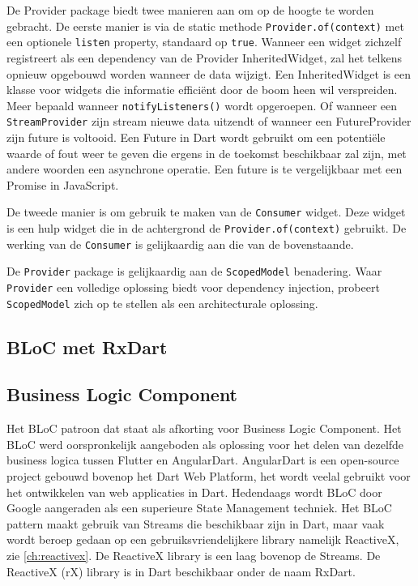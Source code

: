 De Provider package biedt twee manieren aan om op de hoogte te worden gebracht.
\newline
De eerste manier is via de static methode \verb|Provider.of(context)| met een optionele \verb|listen| property, standaard op \verb|true|.
Wanneer een widget zichzelf registreert als een dependency van de Provider InheritedWidget, zal het telkens opnieuw opgebouwd worden wanneer de data wijzigt. Een InheritedWidget is een klasse voor widgets die informatie efficiënt door de boom heen wil verspreiden.
 Meer bepaald wanneer \verb|notifyListeners()| wordt opgeroepen. Of wanneer een \verb|StreamProvider| zijn stream nieuwe data uitzendt of wanneer een FutureProvider zijn future is voltooid. Een Future in Dart wordt gebruikt om een potentiële waarde of fout weer te geven die ergens in de toekomst beschikbaar zal zijn, met andere woorden een asynchrone operatie. Een future is te vergelijkbaar met een Promise in JavaScript.

De tweede manier is om gebruik te maken van de \verb|Consumer| widget. Deze widget is een hulp widget die in de achtergrond de \verb|Provider.of(context)| gebruikt. De werking van de \verb|Consumer| is gelijkaardig aan die van de bovenstaande. 

De \verb|Provider| package is gelijkaardig aan de \verb|ScopedModel| benadering. Waar \verb|Provider| een volledige oplossing biedt voor dependency injection, probeert \verb|ScopedModel| zich op te stellen als een architecturale oplossing.

\subsection{BLoC met RxDart}
\subsection*{Business Logic Component}
Het BLoC patroon dat staat als afkorting voor Business Logic Component. Het BLoC werd oorspronkelijk aangeboden als oplossing voor het delen van dezelfde business logica tussen Flutter en AngularDart. AngularDart is een open-source project gebouwd bovenop het Dart Web Platform, het wordt veelal gebruikt voor het ontwikkelen van web applicaties in Dart. Hedendaags wordt BLoC door Google aangeraden als een superieure State Management techniek. Het BLoC pattern maakt gebruik van Streams die beschikbaar zijn in Dart, maar vaak wordt beroep gedaan op een gebruiksvriendelijkere library namelijk ReactiveX, zie \ref{ch:reactivex}. De ReactiveX library is een laag bovenop de Streams.
\newline
De ReactiveX (rX) library is in Dart beschikbaar onder de naam RxDart.

